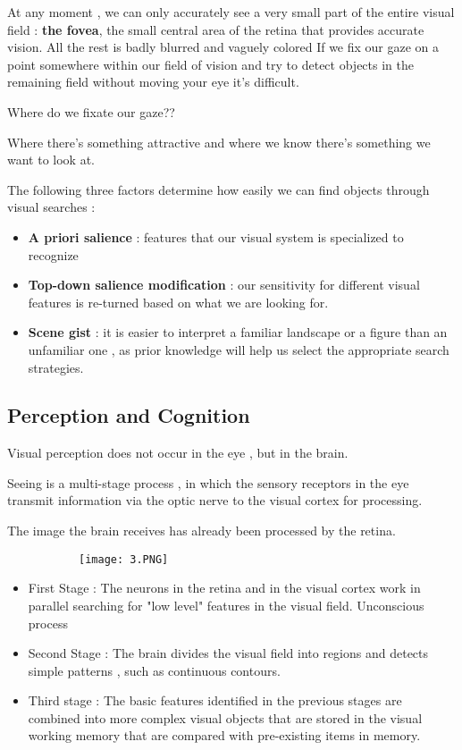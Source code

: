 \documentclass{article}
\begin{document}
At any moment , we can only accurately see a very small part of the entire visual field : \textbf{the fovea}, the small central area of the retina that provides accurate vision. All the rest is badly blurred and vaguely colored
If we fix our gaze on a point somewhere within our field of vision and try to detect objects in the remaining field without moving your eye it's difficult.

Where do we fixate our gaze??

Where there's something attractive and where we know there's something we want to look at.

The following three factors determine how easily we can find objects through visual searches : 

\begin{itemize}
    \item \textbf{A priori salience} : features that our visual system is specialized to recognize
    \item \textbf{Top-down salience modification} : our sensitivity for different visual features is re-turned based on what we are looking for.
    \item \textbf{Scene gist} : it is easier to interpret a familiar landscape or a figure than an unfamiliar one , as prior knowledge will help us select the appropriate search strategies.
\end{itemize}

\subsection{Perception and Cognition}

Visual perception does not occur in the eye , but in the brain.

Seeing is a multi-stage process , in which the sensory receptors in the eye transmit information via the optic nerve to the visual cortex for processing.

The image the brain receives has already been processed by the retina.

\begin{figure}[ht!]
  \centering
  \begin{subfigure}[b]{0.5\linewidth}
    \texttt{[image: 3.PNG]}
  \end{subfigure}
\end{figure}

\begin{itemize}
    \item First Stage : The neurons in the retina and in the visual cortex work in parallel searching for "low level" features in the visual field. Unconscious process
    \item Second Stage : The brain divides the visual field into regions and detects simple patterns , such as continuous contours.
    \item Third stage : The basic features identified in the previous stages are combined into more complex visual objects that are stored in the visual working memory that are compared with pre-existing items in memory.
\end{itemize}
\end{document}
